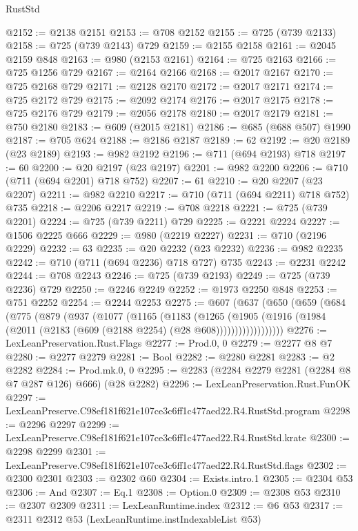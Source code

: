 \begin{lexlean}{RustStd}
\begin{coremodule}
@2152 := @2138 @2151
@2153 := @708 @2152
@2155 := @725 (@739 @2133)
@2158 := @725 (@739 @2143) @729
@2159 := @2155 @2158
@2161 := @2045 @2159 @848
@2163 := @980 (@2153 @2161)
@2164 := @725 @2163
@2166 := @725 @1256 @729
@2167 := @2164 @2166
@2168 := @2017 @2167
@2170 := @725 @2168 @729
@2171 := @2128 @2170
@2172 := @2017 @2171
@2174 := @725 @2172 @729
@2175 := @2092 @2174
@2176 := @2017 @2175
@2178 := @725 @2176 @729
@2179 := @2056 @2178
@2180 := @2017 @2179
@2181 := @750 @2180
@2183 := @609 (@2015 @2181)
@2186 := @685 (@688 @507) @1990
@2187 := @705 @624
@2188 := @2186 @2187
@2189 := 62
@2192 := @20 @2189 (@23 @2189)
@2193 := @982 @2192
@2196 := @711 (@694 @2193) @718
@2197 := 60
@2200 := @20 @2197 (@23 @2197)
@2201 := @982 @2200
@2206 := @710 (@711 (@694 @2201) @718 @752)
@2207 := 61
@2210 := @20 @2207 (@23 @2207)
@2211 := @982 @2210
@2217 := @710 (@711 (@694 @2211) @718 @752) @735
@2218 := @2206 @2217
@2219 := @708 @2218
@2221 := @725 (@739 @2201)
@2224 := @725 (@739 @2211) @729
@2225 := @2221 @2224
@2227 := @1506 @2225 @666
@2229 := @980 (@2219 @2227)
@2231 := @710 (@2196 @2229)
@2232 := 63
@2235 := @20 @2232 (@23 @2232)
@2236 := @982 @2235
@2242 := @710 (@711 (@694 @2236) @718 @727) @735
@2243 := @2231 @2242
@2244 := @708 @2243
@2246 := @725 (@739 @2193)
@2249 := @725 (@739 @2236) @729
@2250 := @2246 @2249
@2252 := @1973 @2250 @848
@2253 := @751 @2252
@2254 := @2244 @2253
@2275 := @607
    (@637
      (@650
        (@659
          (@684
            (@775
              (@879
                (@937
                  (@1077
                    (@1165
                      (@1183
                        (@1265
                          (@1905
                            (@1916
                              (@1984 (@2011 (@2183 (@609 (@2188 @2254) (@28 @608))))))))))))))))))
@2276 := LexLeanPreservation.Rust.Flags
@2277 := Prod.{0, 0}
@2279 := @2277 @8 @7
@2280 := @2277 @2279
@2281 := Bool
@2282 := @2280 @2281
@2283 := @2 @2282
@2284 := Prod.mk.{0, 0}
@2295 := @2283 (@2284 @2279 @2281 (@2284 @8 @7 @287 @126) @666) (@28 @2282)
@2296 := LexLeanPreservation.Rust.FunOK
@2297 := LexLeanPreserve.C98ef181f621e107ce3c6ff1c477aed22.R4.RustStd.program
@2298 := @2296 @2297
@2299 := LexLeanPreserve.C98ef181f621e107ce3c6ff1c477aed22.R4.RustStd.krate
@2300 := @2298 @2299
@2301 := LexLeanPreserve.C98ef181f621e107ce3c6ff1c477aed22.R4.RustStd.flags
@2302 := @2300 @2301
@2303 := @2302 @60
@2304 := Exists.intro.{1}
@2305 := @2304 @53
@2306 := And
@2307 := Eq.{1}
@2308 := Option.{0}
@2309 := @2308 @53
@2310 := @2307 @2309
@2311 := LexLeanRuntime.index
@2312 := @6 @53
@2317 := @2311 @2312 @53 (LexLeanRuntime.instIndexableList @53)

\end{coremodule}
\end{lexlean}
